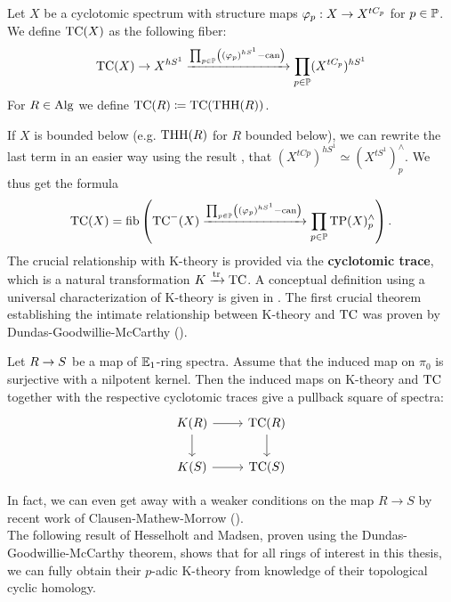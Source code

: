 \begin{defn}
    Let $X$ be a cyclotomic spectrum with structure maps $\varphi_p:X\rightarrow X^{tC_p}$ for $p\in\mathbb{P}$. We define $\operatorname{TC}(X)$ as the following fiber:
    \begin{equation*}
        \operatorname{TC}(X)\rightarrow X^{hS^1}\xrightarrow{\prod_{p\in\mathbb{P}}\left( (\varphi_p)^{hS^1}-\textrm{can} \right)}\prod_{p\in\mathbb{P}}(X^{tC_p})^{hS^1} 
    \end{equation*}
    For $R\in \operatorname{Alg}$ we define $\operatorname{TC}(R)\coloneqq \operatorname{TC}(\operatorname{THH}(R))$.
\end{defn}
If $X$ is bounded below (e.g. $\operatorname{THH}(R)$ for $R$ bounded below), we can rewrite the last term in an easier way using the result \cite[Lemma~II.4.2]{NS}, that $(X^{tCp})^{hS^1}\simeq (X^{tS^1})_p^{\wedge}$. We thus get the formula
\begin{equation*}
    \operatorname{TC}(X)=\operatorname{fib}\left(  \operatorname{TC}^{-}(X)\xrightarrow{\prod_{p\in\mathbb{P}}\left( (\varphi_p)^{hS^1}-\textrm{can} \right)}\prod_{p\in\mathbb{P}} \operatorname{TP}(X)^{\wedge}_p\right).
\end{equation*}
The crucial relationship with K-theory is provided via the \textbf{cyclotomic trace}, which is a natural transformation $K\xrightarrow{\operatorname{tr}} \operatorname{TC}$. A conceptual definition using a universal characterization of K-theory is given in \cite[Section~10.3]{BGTuniversal}.
The first crucial theorem establishing the intimate relationship between K-theory and $\operatorname{TC}$ was proven by Dundas-Goodwillie-McCarthy (\cite[Theorem~7.2.2.1]{DundasGoodwillieMccarthyLocalstructure}).
\begin{thm}
    Let $R\rightarrow S$ be a map of $\mathbb{E}_1$-ring spectra. Assume that the induced map on $\pi_0$ is surjective with a nilpotent kernel. Then the induced maps on K-theory and $\operatorname{TC}$ together with the respective cyclotomic traces give a pullback square of spectra:
    \[\begin{tikzcd}
        {K(R)} & {\mathrm{TC}(R)} \\
        {K(S)} & {\mathrm{TC}(S)}
        \arrow[from=1-1, to=1-2]
        \arrow[from=1-2, to=2-2]
        \arrow[from=1-1, to=2-1]
        \arrow[from=2-1, to=2-2]
    \end{tikzcd}\]
\end{thm}
In fact, we can even get away with a weaker conditions on the map $R\to S$ by recent work of Clausen-Mathew-Morrow (\cite[Theorem~A]{CMMHenselian}).\\
The following result of Hesselholt and Madsen, proven using the Dundas-Goodwillie-McCarthy theorem, shows that for all rings of interest in this thesis, we can fully obtain their $p$-adic K-theory from knowledge of their topological cyclic homology.  
